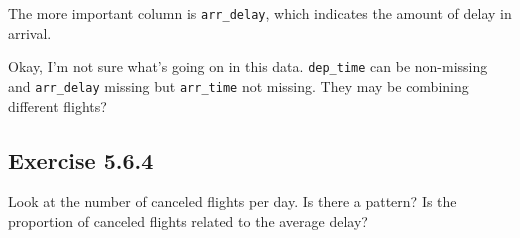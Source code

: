 \documentclass[]{book}
\newenvironment{Shaded}{\begin{snugshade}}{\end{snugshade}}
\newcommand{\CommentTok}[1]{\textcolor[rgb]{0.56,0.35,0.01}{\textit{#1}}}
\newcommand{\KeywordTok}[1]{\textcolor[rgb]{0.13,0.29,0.53}{\textbf{#1}}}
\newcommand{\NormalTok}[1]{#1}
\newcommand{\OperatorTok}[1]{\textcolor[rgb]{0.81,0.36,0.00}{\textbf{#1}}}
\newcommand{\StringTok}[1]{\textcolor[rgb]{0.31,0.60,0.02}{#1}}
\theoremstyle{plain}
\theoremstyle{remark}
\begin{document}
The more important column is \texttt{arr\_delay}, which indicates the
amount of delay in arrival.

\begin{Shaded}
\end{Shaded}

Okay, I'm not sure what's going on in this data. \texttt{dep\_time} can
be non-missing and \texttt{arr\_delay} missing but \texttt{arr\_time}
not missing. They may be combining different flights?

\hypertarget{exercise-5.6.4}{%
\subsection*{\texorpdfstring{Exercise
{5.6.4}}{Exercise 5.6.4}}\label{exercise-5.6.4}}

Look at the number of canceled flights per day. Is there a pattern? Is
the proportion of canceled flights related to the average delay?
\end{document}
